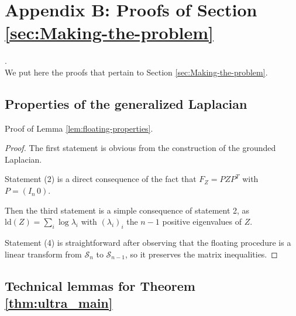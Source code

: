 
\section*{Appendix B: Proofs of Section \ref{sec:Making-the-problem}}

.\\


We put here the proofs that pertain to Section \ref{sec:Making-the-problem}.


\subsection{Properties of the generalized Laplacian}

Proof of Lemma \ref{lem:floating-properties}. 
\begin{proof}
The first statement is obvious from the construction of the grounded
Laplacian.

Statement (2) is a direct consequence of the fact that $F_{Z}=PZP^{T}$
with $P=\left(I_{n}\,0\right)$.

Then the third statement is a simple consequence of statement 2, as
$\text{ld}\left(Z\right)=\sum_{i}\log\lambda_{i}$ with $\left(\lambda_{i}\right)_{i}$
the $n-1$ positive eigenvalues of $Z$.

Statement (4) is straightforward after observing that the floating
procedure is a linear transform from $\mathcal{S}_{n}$ to $\mathcal{S}_{n-1}$,
so it preserves the matrix inequalities. 
\end{proof}

\subsection{Technical lemmas for Theorem \ref{thm:ultra_main}}

